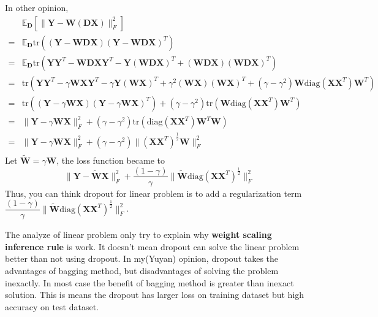 In other opinion,
\begin{align}
&\mathbb E_{\mathbf D}[\|\mathbf Y-\mathbf W(\mathbf D\mathbf X) \|^2_F]\\
=&\mathbb E_{\mathbf D}\text{tr}((\mathbf Y-\mathbf W \mathbf D \mathbf X)(\mathbf Y-\mathbf W \mathbf D \mathbf X)^T)\\
=&\mathbb E_{\mathbf D}\text{tr}(\mathbf Y \mathbf Y^T-\mathbf W \mathbf D \mathbf X \mathbf Y^T-\mathbf Y(\mathbf W \mathbf D \mathbf X)^T+(\mathbf W \mathbf D \mathbf X)(\mathbf W \mathbf D \mathbf X)^T)\\
=&\text{tr}(\mathbf Y \mathbf Y^T-\gamma\mathbf W \mathbf X \mathbf Y^T-\gamma \mathbf Y(\mathbf W  \mathbf X)^T+\gamma^2(\mathbf W \mathbf X)(\mathbf W  \mathbf X)^T+(\gamma-\gamma^2)\mathbf W \text{diag}(\mathbf X\mathbf X^T)\mathbf W^T )\\
=&\text{tr}((\mathbf Y-\gamma \mathbf W  \mathbf X)(\mathbf Y-\gamma \mathbf W \mathbf X)^T)+(\gamma-\gamma^2)\text{tr}(\mathbf W \text{diag}(\mathbf X\mathbf X^T)\mathbf W^T )\\
=&\|\mathbf Y-\gamma \mathbf W  \mathbf X\|^2_F+(\gamma-\gamma^2)\text{tr}( \text{diag}(\mathbf X\mathbf X^T)\mathbf W^T\mathbf W )\\
=&\|\mathbf Y-\gamma \mathbf W  \mathbf X\|^2_F+(\gamma-\gamma^2)\|(\mathbf X\mathbf X^T)^{\frac 12}\mathbf W\|_F^2\\
\end{align}
Let $ \tilde{\mathbf W}=\gamma \mathbf W$, the loss function became to 
\begin{equation}
\|\mathbf Y-\tilde{\mathbf W} \mathbf X\|^2_F+\dfrac {(1-\gamma)}\gamma\|\tilde{\mathbf W}\text{diag}(\mathbf X\mathbf X^T)^{\frac 12}\|_F^2
\end{equation}
Thus, you can think dropout for linear problem is to add a regularization term $\dfrac {(1-\gamma)}\gamma\|\tilde{\mathbf W}\text{diag}(\mathbf X\mathbf X^T)^{\frac 12}\|_F^2$.



\begin{remark}
	The analyze of linear problem only try to explain why \textbf{weight scaling inference rule} is work. It doesn't mean dropout can solve the linear problem better than not using dropout. In my(Yuyan) opinion, dropout takes the advantages of bagging method, but disadvantages of solving the problem inexactly. In most case the benefit of bagging method is greater than inexact solution. This is means the dropout has larger loss on training dataset but high accuracy on test dataset.
\end{remark}


